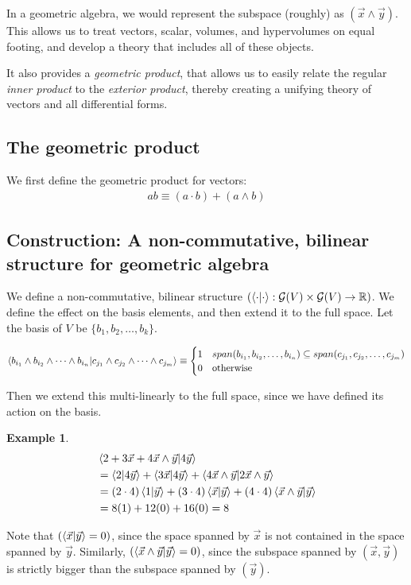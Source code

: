 \documentclass[11pt]{book}
\newcommand{\R}{\ensuremath{\mathbb R}}
\newcommand{\G}{\ensuremath{\mathcal{G}}}
\newtheorem{example}[theorem]{Example}
\begin{document}
In a geometric algebra, we would represent the subspace (roughly) as $(\vec x \wedge \vec y)$.
This allows us to treat vectors, scalar, volumes, and hypervolumes on
equal footing, and develop a theory that includes all of these objects.

It also provides a \emph{geometric product}, that allows us to easily relate
the regular \emph{inner product} to the \emph{exterior product}, thereby
creating a unifying theory of vectors and all differential forms.

\subsection{The geometric product}

We first define the geometric product for vectors:
\begin{align*}
    ab \equiv (a \cdot b) + (a \wedge b)
\end{align*}


\subsection{Construction: A non-commutative, bilinear structure for geometric algebra}

We define a non-commutative, bilinear structure
$\left(\braket{\cdot}{\cdot}: \G(V) \times \G(V) \rightarrow \R\right)$. We
define the effect on the basis elements, and then extend it to the
full space. Let the basis of $V$ be $\{ b_1, b_2, \dots, b_k \}$.


\begin{align*}
\braket{b_{i_1} \wedge b_{i_2} \wedge \dots \wedge b_{i_n}}{c_{j_1} \wedge c_{j_2} \wedge \dots \wedge c_{j_m}}
\equiv
\begin{cases}
1 & span(b_{i_1}, b_{i_2}, \dots, b_{i_n}) \subseteq span(c_{j_1}, c_{j_2}, \dots, c_{j_m}) \\
0 & \text{otherwise}
\end{cases}
\end{align*}

Then we extend this multi-linearly to the full space, since we have defined its
action on the basis.

\begin{example}
\begin{align*}
&\braket{2 + 3\vec x + 4 \vec x \wedge \vec y}{4\vec y} \\
&= \braket{2}{4\vec y} +
 \braket{3\vec x}{4\vec y} +
 \braket{4 \vec x \wedge \vec y}{2 \vec x \wedge \vec y} \\
&= (2 \cdot 4)\braket{1}{\vec y} + 
   (3 \cdot 4) \braket{\vec x}{\vec y} + 
   (4 \cdot 4) \braket{\vec x \wedge \vec y}{\vec y} \\
&= 8 (1) + 12 (0) + 16 (0) = 8
\end{align*}
\end{example}
Note that $(\braket{\vec x}{\vec y} = 0)$, since the space spanned by $\vec x$
is not contained in the space spanned by $\vec y$. Similarly, 
$(\braket{\vec x \wedge \vec y}{\vec y} = 0)$, since the subspace spanned by
$(\vec x, \vec y)$ is strictly bigger than the subspace spanned by $(\vec y)$.
\end{document}
